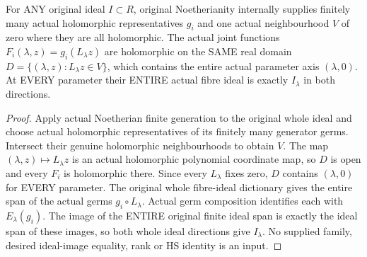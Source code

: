 \begin{theorem}
\label{hir:actual-coordinate-specialization-whole-fibre-ideal}
\leanok
{}
For ANY original ideal $I\subset R$, original Noetherianity internally
supplies finitely many actual holomorphic representatives $g_i$ and one
actual neighbourhood $V$ of zero where they are all holomorphic. The actual
joint functions $F_i(\lambda,z)=g_i(L_\lambda z)$ are holomorphic on
the SAME real domain $D=\{(\lambda,z):L_\lambda z\in V\}$, which contains
the entire actual parameter axis $(\lambda,0)$. At EVERY parameter their
ENTIRE actual fibre ideal is exactly $I_\lambda$ in both directions.
\end{theorem}
\begin{proof}
Apply actual Noetherian finite generation to the original whole ideal and
choose actual holomorphic representatives of its finitely many generator
germs. Intersect their genuine holomorphic neighbourhoods to obtain $V$.
The map $(\lambda,z)\mapsto L_\lambda z$ is an actual holomorphic
polynomial coordinate map, so $D$ is open and every $F_i$ is holomorphic
there. Since every $L_\lambda$ fixes zero, $D$ contains $(\lambda,0)$ for
EVERY parameter. The original whole fibre-ideal dictionary gives the entire
span of the actual germs $g_i\circ L_\lambda$. Actual germ composition
identifies each with $E_\lambda(g_i)$. The image of the ENTIRE original
finite ideal span is exactly the ideal span of these images, so both
whole ideal directions give $I_\lambda$. No supplied family, desired
ideal-image equality, rank or HS identity is an input.
\end{proof}

